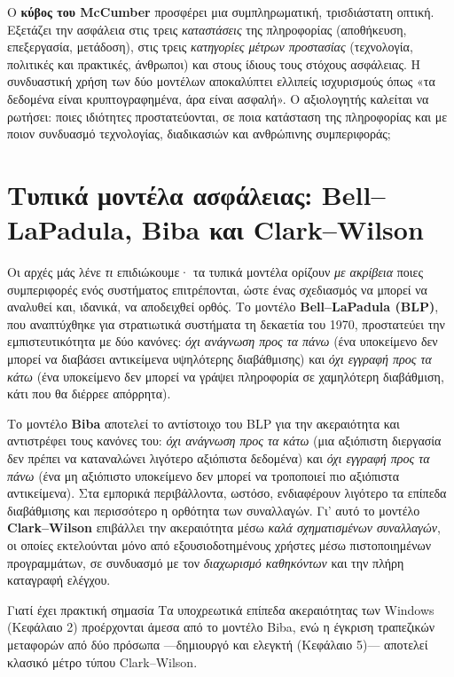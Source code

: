 Ο \textbf{κύβος του McCumber} προσφέρει μια συμπληρωματική, τρισδιάστατη οπτική. Εξετάζει την ασφάλεια στις τρεις \emph{καταστάσεις} της πληροφορίας (αποθήκευση, επεξεργασία, μετάδοση), στις τρεις \emph{κατηγορίες μέτρων προστασίας} (τεχνολογία, πολιτικές και πρακτικές, άνθρωποι) και στους ίδιους τους στόχους ασφάλειας. Η συνδυαστική χρήση των δύο μοντέλων αποκαλύπτει ελλιπείς ισχυρισμούς όπως «τα δεδομένα είναι κρυπτογραφημένα, άρα είναι ασφαλή». Ο αξιολογητής καλείται να ρωτήσει: ποιες ιδιότητες προστατεύονται, σε ποια κατάσταση της πληροφορίας και με ποιον συνδυασμό τεχνολογίας, διαδικασιών και ανθρώπινης συμπεριφοράς;

\section{Τυπικά μοντέλα ασφάλειας: Bell–LaPadula, Biba και Clark–Wilson}\label{sec:1.7}
Οι αρχές μάς λένε \emph{τι} επιδιώκουμε· τα τυπικά μοντέλα ορίζουν \emph{με ακρίβεια} ποιες συμπεριφορές ενός συστήματος επιτρέπονται, ώστε ένας σχεδιασμός να μπορεί να αναλυθεί και, ιδανικά, να αποδειχθεί ορθός. Το μοντέλο \textbf{Bell–LaPadula (BLP)}, που αναπτύχθηκε για στρατιωτικά συστήματα τη δεκαετία του 1970, προστατεύει την εμπιστευτικότητα με δύο κανόνες: \emph{όχι ανάγνωση προς τα πάνω} (ένα υποκείμενο δεν μπορεί να διαβάσει αντικείμενα υψηλότερης διαβάθμισης) και \emph{όχι εγγραφή προς τα κάτω} (ένα υποκείμενο δεν μπορεί να γράψει πληροφορία σε χαμηλότερη διαβάθμιση, κάτι που θα διέρρεε απόρρητα).

Το μοντέλο \textbf{Biba} αποτελεί το αντίστοιχο του BLP για την ακεραιότητα και αντιστρέφει τους κανόνες του: \emph{όχι ανάγνωση προς τα κάτω} (μια αξιόπιστη διεργασία δεν πρέπει να καταναλώνει λιγότερο αξιόπιστα δεδομένα) και \emph{όχι εγγραφή προς τα πάνω} (ένα μη αξιόπιστο υποκείμενο δεν μπορεί να τροποποιεί πιο αξιόπιστα αντικείμενα). Στα εμπορικά περιβάλλοντα, ωστόσο, ενδιαφέρουν λιγότερο τα επίπεδα διαβάθμισης και περισσότερο η ορθότητα των συναλλαγών. Γι' αυτό το μοντέλο \textbf{Clark–Wilson} επιβάλλει την ακεραιότητα μέσω \emph{καλά σχηματισμένων συναλλαγών}, οι οποίες εκτελούνται μόνο από εξουσιοδοτημένους χρήστες μέσω πιστοποιημένων προγραμμάτων, σε συνδυασμό με τον \emph{διαχωρισμό καθηκόντων} και την πλήρη καταγραφή ελέγχου.

\begin{notebox}{Γιατί έχει πρακτική σημασία}
Τα υποχρεωτικά επίπεδα ακεραιότητας των Windows (Κεφάλαιο 2) προέρχονται άμεσα από το μοντέλο Biba, ενώ η έγκριση τραπεζικών μεταφορών από δύο πρόσωπα —δημιουργό και ελεγκτή (Κεφάλαιο 5)— αποτελεί κλασικό μέτρο τύπου Clark–Wilson.
\end{notebox}

